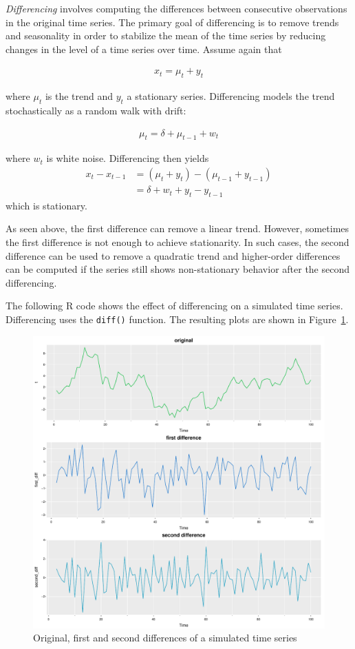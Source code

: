 \emph{Differencing} involves computing the differences between consecutive observations in the original time series. The primary goal of differencing is to remove trends and seasonality in order to stabilize the mean of the time series by reducing changes in the level of a time series over time. Assume again that 

\begin{align*}x_t = \mu_t + y_t\end{align*}

\noindent where $\mu_t$ is the trend and $y_t$ a stationary series. Differencing models the trend stochastically as a random walk with drift: 

\begin{align*}\mu_t = \delta + \mu_{t-1} + w_t\end{align*}

\noindent where $w_t$ is white noise. Differencing then yields 
\begin{align*}
x_t - x_{t-1} &= (\mu_t + y_t) - (\mu_{t-1} + y_{t-1}) \\
 &= \delta + w_t + y_t - y_{t-1}
 \end{align*}
\noindent which is stationary.

As seen above, the first difference can remove a linear trend. However, sometimes the first difference is not enough to achieve stationarity. In such cases, the second difference can be used to remove a quadratic trend and higher-order differences can be computed if the series still shows non-stationary behavior after the second differencing.

The following R code shows the effect of differencing on a simulated time series. Differencing uses the \texttt{diff()} function. The resulting plots are shown in Figure~\ref{fig:figure40a}.

\begin{figure}
\centering
\includegraphics[width=.75\textwidth]{figure40a.pdf}
\caption{Original, first and second differences of a simulated time series}
\label{fig:figure40a}
\end{figure}

